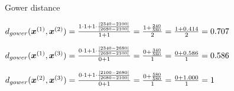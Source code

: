 \begin{vbframe}{Gower distance}
\vfill

$d_{gower}(\bm{x}^{(1)},\bm{x}^{(2)}) = \frac{ 1 \cdot 1 + 1 \cdot \frac{\left| 2340 - 2100 \right|}
{\left| 2680 - 2100 \right|}}{1 + 1} = \frac{1 + \frac{240}{580}}{2} = \frac{1 + 0.414}{2} = 0.707
$

\vfill

$d_{gower}(\bm{x}^{(1)},\bm{x}^{(3)}) = \frac{ 0 \cdot 1 + 1 \cdot \frac{\left| 2340 - 2680 \right|}
{\left| 2680 - 2100 \right|}}{0 + 1} = \frac{0 + \frac{340}{580}}{1} = \frac{0 + 0.586}{1} = 0.586
$

\vfill

$d_{gower}(\bm{x}^{(2)},\bm{x}^{(3)}) = \frac{0 \cdot 1 + 1 \cdot \frac{\left| 2100 - 2680 \right|}
{\left| 2680 - 2100 \right|}}{0 + 1} = \frac{0 + \frac{580}{580}}{1} = \frac{0 + 1.000}{1} = 1
$

\vfill
\end{vbframe}





\endlecture


